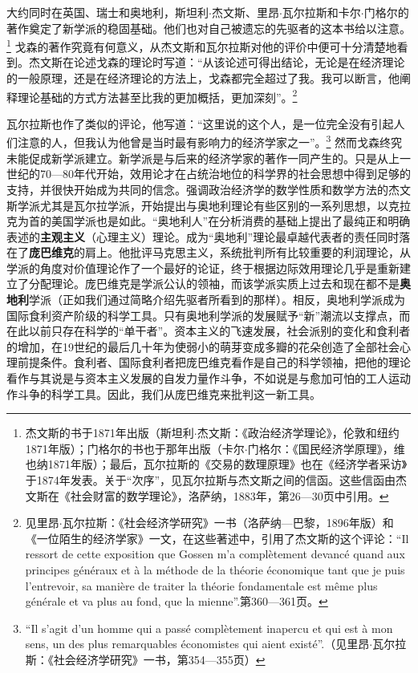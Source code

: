 \documentclass[fontset=fandol, a4paper, 12pt, openright]{ctexbook}
\begin{document}
大约同时在英国、瑞士和奥地利，斯坦利$\cdot$杰文斯、里昂$\cdot$瓦尔拉斯和卡尔$\cdot$门格尔的著作奠定了新学派的稳固基础。他们也对自己被遗忘的先驱者的这本书给以注意。\footnote{杰文斯的书于1871年出版（斯坦利$\cdot$杰文斯：《政治经济学理论》，伦敦和纽约1871年版）；门格尔的书也于那年出版（卡尔$\cdot$门格尔：《国民经济学原理》，维也纳1871年版）；最后，瓦尔拉斯的《交易的数理原理》也在《经济学者采访》于1874年发表。关于“次序”，见瓦尔拉斯与杰文斯之间的信函。这些信函由杰文斯在《社会财富的数学理论》，洛萨纳，1883年，第26—30页中引用。} 戈森的著作究竟有何意义，从杰文斯和瓦尔拉斯对他的评价中便可十分清楚地看到。杰文斯在论述戈森的理论时写道：“从该论述可得出结论，无论是在经济理论的一般原理，还是在经济理论的方法上，戈森都完全超过了我。我可以断言，他阐释理论基础的方式方法甚至比我的更加概括，更加深刻”。\footnote{见里昂$\cdot$瓦尔拉斯：《社会经济学研究》一书（洛萨纳—巴黎，1896年版）和《一位陌生的经济学家》一文，在这些著述中，引用了杰文斯的这个评论：“Il ressort de cette exposition que Gossen m'a compl\`{e}tement devanc\'{e} quand aux principes g\'{e}n\'{e}raux et \`{a} la m\'{e}thode de la th\'{e}orie \'{e}conomique tant que je puis l'entrevoir, sa mani\`{e}re de traiter la th\'{e}orie fondamentale est m\^{e}me plus g\'{e}n\'{e}rale et va plus au fond, que la mienne”.第360—361页。}

瓦尔拉斯也作了类似的评论，他写道：“这里说的这个人，是一位完全没有引起人们注意的人，但我认为他曾是当时最有影响力的经济学家之一”。\footnote{``Il s'agit d'un homme qui a pass\'{e} compl\`{e}tement inapercu et qui est \`{a} mon sens, un des plus remarquables \'{e}conomistes qui aient exist\'{e}''.（见里昂$\cdot$瓦尔拉斯：《社会经济学研究》一书，第354—355页）} 然而戈森终究未能促成新学派建立。新学派是与后来的经济学家的著作一同产生的。只是从上一世纪的70—80年代开始，效用论才在占统治地位的科学界的社会思想中得到足够的支持，并很快开始成为共同的信念。强调政治经济学的数学性质和数学方法的杰文斯学派尤其是瓦尔拉学派，开始提出与奥地利理论有些区别的一系列思想，以克拉克为首的美国学派也是如此。“奥地利人”在分析消费的基础上提出了最纯正和明确表述的\textbf{主观主义}（心理主义）理论。成为“奥地利”理论最卓越代表者的责任同时落在了\textbf{庞巴维克}的肩上。他批评马克思主义，系统批判所有比较重要的利润理论，从学派的角度对价值理论作了一个最好的论证，终于根据边际效用理论几乎是重新建立了分配理论。庞巴维克是学派公认的领袖，而该学派实质上过去和现在都不是\textbf{奥地利}学派（正如我们通过简略介绍先驱者所看到的那样）。相反，奥地利学派成为国际食利资产阶级的科学工具。只有奥地利学派的发展赋予“新”潮流以支撑点，而在此以前只存在科学的“单干者”。资本主义的飞速发展，社会派别的变化和食利者的增加，在19世纪的最后几十年为使弱小的萌芽变成多瓣的花朵创造了全部社会心理前提条件。食利者、国际食利者把庞巴维克看作是自己的科学领袖，把他的理论看作与其说是与资本主义发展的自发力量作斗争，不如说是与愈加可怕的工人运动作斗争的科学工具。因此，我们从庞巴维克来批判这一新工具。
\end{document}
